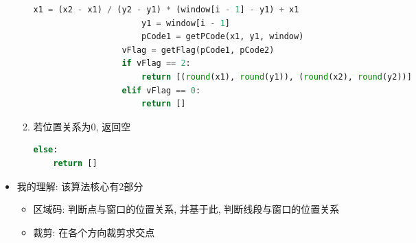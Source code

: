 \documentclass[a4paper,UTF8]{article}
\theoremstyle{definition}
\begin{document}
\begin{itemize}
\begin{enumerate}
\begin{lstlisting}[language={Python}]
                          x1 = (x2 - x1) / (y2 - y1) * (window[i - 1] - y1) + x1
                      y1 = window[i - 1]
                      pCode1 = getPCode(x1, y1, window)
                  vFlag = getFlag(pCode1, pCode2)
                  if vFlag == 2:             
                      return [(round(x1), round(y1)), (round(x2), round(y2))]
                  elif vFlag == 0: 
                      return []\end{lstlisting}
    \item 若位置关系为0, 返回空
    \begin{lstlisting}[language={Python}] 
  else:
    return []\end{lstlisting}
    \end{enumerate}
  \item 我的理解: 该算法核心有2部分\begin{itemize}
    \item 区域码: 判断点与窗口的位置关系, 并基于此, 判断线段与窗口的位置关系
    \item 裁剪: 在各个方向裁剪求交点
  \end{itemize}
\end{itemize}
\end{document}
